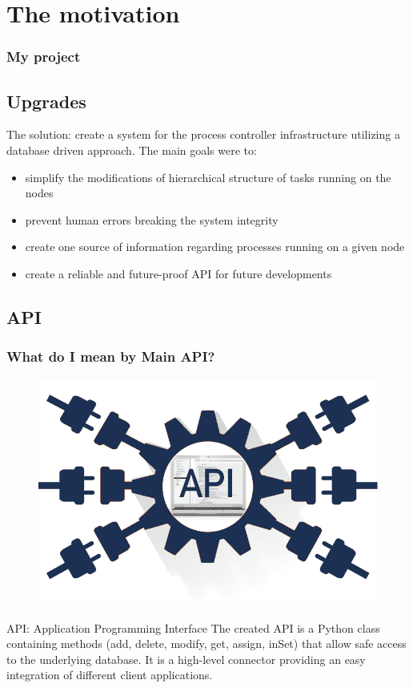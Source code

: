 \documentclass{beamer}
\begin{document}
\section{The motivation}
\begin{frame}
\frametitle{My project}
\subsection{Upgrades}
\begin{block}{The solution: create a system for the process controller infrastructure utilizing a database driven approach. The main goals were to:}
\begin{itemize}
\item simplify the modifications of hierarchical structure of tasks running on the nodes
\item prevent human errors breaking the system integrity
\item create one source of information regarding processes running on a given node
\item create a reliable and future-proof API for future developments
\end{itemize}
\end{block}
\end{frame}


\begin{frame}
\subsection{API}
\frametitle{What do I mean by Main API?}
\begin{figure}[H]
	\centering
    \includegraphics[scale=0.22]{api.png}
\end{figure}
\begin{block}{API: Application Programming Interface}
The created API is a Python class containing methods (add, delete, modify, get, assign, inSet) that allow safe access to the underlying database. It is a high-level connector providing an easy integration of different client applications.
\end{block}

\end{frame}
\end{document}
